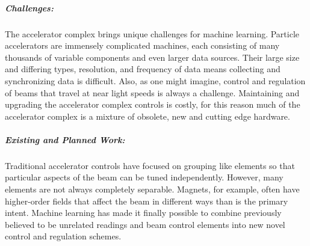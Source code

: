 \subparagraph*{Challenges:} 
            The accelerator complex brings unique challenges for machine learning. Particle accelerators are immensely complicated machines, each consisting of many thousands of variable components and even larger data sources. Their large size and differing types, resolution, and frequency of data means collecting and synchronizing data is difficult. Also, as one might imagine, control and regulation of beams  that travel at near light speeds is always a challenge. Maintaining and upgrading the accelerator complex controls is costly, for this reason much of the accelerator complex is a mixture of obsolete, new and cutting edge hardware. 
            
\subparagraph*{Existing and Planned Work:} 
            Traditional accelerator controls have focused on grouping like elements so that particular aspects of the beam can be tuned independently. However, many elements are not always completely separable. Magnets, for example, often have higher-order fields that affect the beam in different ways than is the primary intent. 
            Machine learning has made it finally possible to combine previously believed to be unrelated readings and beam control elements into new novel control and regulation schemes. 
            
